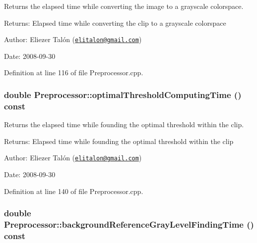 Returns the elapsed time while converting the image to a grayscale colorspace. 

\begin{Desc}
\item[Returns:]Elapsed time while converting the clip to a grayscale colorspace\end{Desc}
\begin{Desc}
\item[Author:]Eliezer Talón (\href{mailto:elitalon@gmail.com}{\tt elitalon@gmail.com}) \end{Desc}
\begin{Desc}
\item[Date:]2008-09-30 \end{Desc}


Definition at line 116 of file Preprocessor.cpp.\hypertarget{class_preprocessor_72dd29238c4202698e67dcb26a47f4b5}{
\subsubsection[optimalThresholdComputingTime]{\setlength{\rightskip}{0pt plus 5cm}double Preprocessor::optimalThresholdComputingTime () const}}
\label{class_preprocessor_72dd29238c4202698e67dcb26a47f4b5}


Returns the elapsed time while founding the optimal threshold within the clip. 

\begin{Desc}
\item[Returns:]Elapsed time while founding the optimal threshold within the clip\end{Desc}
\begin{Desc}
\item[Author:]Eliezer Talón (\href{mailto:elitalon@gmail.com}{\tt elitalon@gmail.com}) \end{Desc}
\begin{Desc}
\item[Date:]2008-09-30 \end{Desc}


Definition at line 140 of file Preprocessor.cpp.\hypertarget{class_preprocessor_3189cad5515476d54cc14effcf983fc7}{
\subsubsection[backgroundReferenceGrayLevelFindingTime]{\setlength{\rightskip}{0pt plus 5cm}double Preprocessor::backgroundReferenceGrayLevelFindingTime () const}}
\label{class_preprocessor_3189cad5515476d54cc14effcf983fc7}


